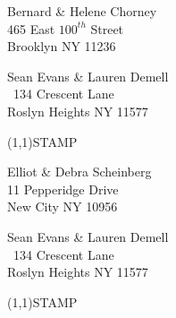 \documentclass[12pt]{article}
\begin{document}
\begin{center} \begin{Huge} \vspace*{\fill}
Bernard \& Helene Chorney\\
465 East $100^{th}$ Street\\
Brooklyn NY 11236\\
\vspace{\fill} \end{Huge} \end{center}

\clearpage

\begin{minipage}{.5\linewidth} \noindent
Sean Evans \& Lauren Demell\\\ 
134 Crescent Lane\\ 
Roslyn Heights NY 11577
\end{minipage}
\begin{minipage}{.5\linewidth \hspace{-.2in} \vspace{-.3in}}
\begin{flushright}
\framebox(1,1){STAMP}
\end{flushright}
\end{minipage}

\begin{center} \begin{Huge} \vspace*{\fill}
Elliot \& Debra Scheinberg\\
11 Pepperidge Drive\\
New City NY  10956\\
\vspace{\fill} \end{Huge} \end{center}

\clearpage

\begin{minipage}{.5\linewidth} \noindent
Sean Evans \& Lauren Demell\\\ 
134 Crescent Lane\\ 
Roslyn Heights NY 11577
\end{minipage}
\begin{minipage}{.5\linewidth \hspace{-.2in} \vspace{-.3in}}
\begin{flushright}
\framebox(1,1){STAMP}
\end{flushright}
\end{minipage}
\end{document}
